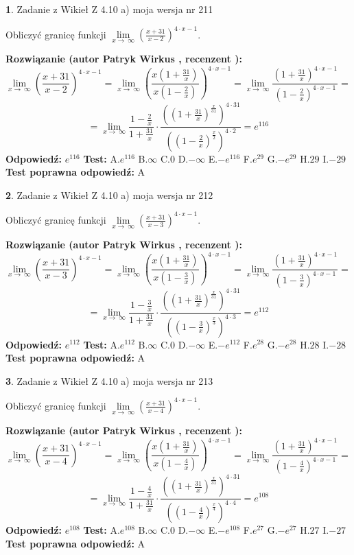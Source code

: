 \documentclass[12pt, a4paper]{article}
\theoremstyle{definition} %
\newtheorem{zad}{}
\newcommand{\zadStart}[1]{\begin{zad}#1\newline}
\newcommand{\zadStop}{\end{zad}}
\newcommand{\rozwStart}[2]{\noindent \textbf{Rozwiązanie (autor #1 , recenzent #2): }\newline}
\newcommand{\rozwStop}{\newline}
\newcommand{\odpStart}{\noindent \textbf{Odpowiedź:}\newline}
\newcommand{\odpStop}{\newline}
\newcommand{\testStart}{\noindent \textbf{Test:}\newline}
\newcommand{\testStop}{\newline}
\newcommand{\kluczStart}{\noindent \textbf{Test poprawna odpowiedź:}\newline}
\newcommand{\kluczStop}{\newline}
\begin{document}
\zadStart{Zadanie z Wikieł Z 4.10 a) moja wersja nr 211}

Obliczyć granicę funkcji  $\lim\limits_{x\to\ \infty}(\frac{x+31}{x-2})^{4\cdot x-1}$.
\zadStop
\rozwStart{Patryk Wirkus}{}
$$\lim\limits_{x\to\ \infty}(\frac{x+31}{x-2})^{4\cdot x-1} = \lim\limits_{x\to\ \infty}(\frac{x(1+\frac{31}{x})}{x(1-\frac{2}{x})})^{4\cdot x-1}=\lim\limits_{x\to\ \infty}\frac{(1+\frac{31}{x})^{4\cdot x-1}}{(1-\frac{2}{x})^{4\cdot x-1}}=$$
$$=\lim\limits_{x\to\ \infty}\frac{1-\frac{2}{x}}{1+\frac{31}{x}}\cdot\frac{((1+\frac{31}{x})^{\frac{x}{31}})^{4\cdot31}}{((1-\frac{2}{x})^{\frac{x}{2}})^{4\cdot2}}=e^{116}$$
\rozwStop
\odpStart
$e^{116}$
\odpStop
\testStart
A.$e^{116}$ B.$\infty$ C.$0$ D.$-\infty$ E.$-e^{116}$
F.$e^{29}$ G.$-e^{29}$
H.$29$
I.$-29$
\testStop
\kluczStart
A
\kluczStop



\zadStart{Zadanie z Wikieł Z 4.10 a) moja wersja nr 212}

Obliczyć granicę funkcji  $\lim\limits_{x\to\ \infty}(\frac{x+31}{x-3})^{4\cdot x-1}$.
\zadStop
\rozwStart{Patryk Wirkus}{}
$$\lim\limits_{x\to\ \infty}(\frac{x+31}{x-3})^{4\cdot x-1} = \lim\limits_{x\to\ \infty}(\frac{x(1+\frac{31}{x})}{x(1-\frac{3}{x})})^{4\cdot x-1}=\lim\limits_{x\to\ \infty}\frac{(1+\frac{31}{x})^{4\cdot x-1}}{(1-\frac{3}{x})^{4\cdot x-1}}=$$
$$=\lim\limits_{x\to\ \infty}\frac{1-\frac{3}{x}}{1+\frac{31}{x}}\cdot\frac{((1+\frac{31}{x})^{\frac{x}{31}})^{4\cdot31}}{((1-\frac{3}{x})^{\frac{x}{3}})^{4\cdot3}}=e^{112}$$
\rozwStop
\odpStart
$e^{112}$
\odpStop
\testStart
A.$e^{112}$ B.$\infty$ C.$0$ D.$-\infty$ E.$-e^{112}$
F.$e^{28}$ G.$-e^{28}$
H.$28$
I.$-28$
\testStop
\kluczStart
A
\kluczStop



\zadStart{Zadanie z Wikieł Z 4.10 a) moja wersja nr 213}

Obliczyć granicę funkcji  $\lim\limits_{x\to\ \infty}(\frac{x+31}{x-4})^{4\cdot x-1}$.
\zadStop
\rozwStart{Patryk Wirkus}{}
$$\lim\limits_{x\to\ \infty}(\frac{x+31}{x-4})^{4\cdot x-1} = \lim\limits_{x\to\ \infty}(\frac{x(1+\frac{31}{x})}{x(1-\frac{4}{x})})^{4\cdot x-1}=\lim\limits_{x\to\ \infty}\frac{(1+\frac{31}{x})^{4\cdot x-1}}{(1-\frac{4}{x})^{4\cdot x-1}}=$$
$$=\lim\limits_{x\to\ \infty}\frac{1-\frac{4}{x}}{1+\frac{31}{x}}\cdot\frac{((1+\frac{31}{x})^{\frac{x}{31}})^{4\cdot31}}{((1-\frac{4}{x})^{\frac{x}{4}})^{4\cdot4}}=e^{108}$$
\rozwStop
\odpStart
$e^{108}$
\odpStop
\testStart
A.$e^{108}$ B.$\infty$ C.$0$ D.$-\infty$ E.$-e^{108}$
F.$e^{27}$ G.$-e^{27}$
H.$27$
I.$-27$
\testStop
\kluczStart
A
\kluczStop
\end{document}
